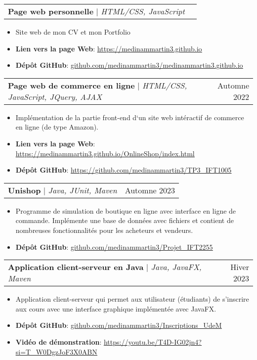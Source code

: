 \documentclass[letterpaper,11pt]{article}
\makeatletter
\newcommand{\resumeItem}[1]{
  \item\small{
    {#1 \vspace{-2pt}}
  }
}
\newcommand{\resumeProjectHeading}[2]{
    \item
    \begin{tabular*}{0.97\textwidth}{l@{\extracolsep{\fill}}r}
      \small#1 & #2 \\
    \end{tabular*}\vspace{-7pt}
}
\newcommand{\resumeItemListStart}{\begin{itemize}}
\newcommand{\resumeItemListEnd}{\end{itemize}\vspace{-5pt}}
\makeatother
\begin{document}
          \resumeProjectHeading
          {\textbf{Page web personnelle} $|$ \emph{HTML/CSS, JavaScript}}{}
          \resumeItemListStart
            \resumeItem{Site web de mon CV et mon Portfolio}
            \resumeItem{\textbf{Lien vers la page Web}: \href{https://medinammartin3.github.io}{\underline{https://medinammartin3.github.io}}}
            \resumeItem{\textbf{Dépôt GitHub}: \href{https://github.com/medinammartin3/medinammartin3.github.io}{\underline{github.com/medinammartin3/medinammartin3.github.io}}}
          \resumeItemListEnd

          \resumeProjectHeading
          {\textbf{Page web de commerce en ligne} $|$ \emph{HTML/CSS, JavaScript, JQuery, AJAX}}{Automne 2022}
          \resumeItemListStart
            \resumeItem{Implémentation de la partie front-end d‘un site web intéractif de commerce en ligne (de type Amazon).}
            \resumeItem{\textbf{Lien vers la page Web}: \href{https://medinammartin3.github.io/OnlineShop/index.html}{\underline{https://medinammartin3.github.io/OnlineShop/index.html}}}
            \resumeItem{\textbf{Dépôt GitHub}: \href{https://github.com/medinammartin3/TP3_IFT1005}{\underline{https://github.com/medinammartin3/TP3\_IFT1005}}}
          \resumeItemListEnd

          \resumeProjectHeading
          {\textbf{Unishop} $|$ \emph{Java, JUnit, Maven}}{Automne 2023}
          \resumeItemListStart
            \resumeItem{Programme de simulation de boutique en ligne avec interface en ligne de commande. Implémente une base de données avec fichiers et contient de nombreuses fonctionnalités pour les acheteurs et vendeurs.}
            \resumeItem{\textbf{Dépôt GitHub}: \href{https://github.com/medinammartin3/Projet_IFT2255}{\underline{github.com/medinammartin3/Projet\_IFT2255}}}
          \resumeItemListEnd

          \resumeProjectHeading
          {\textbf{Application client-serveur en Java} $|$ \emph{Java, JavaFX, Maven}}{Hiver 2023}
          \resumeItemListStart
            \resumeItem{Application client-serveur qui permet aux utilisateur (étudiants) de s’inscrire aux cours avec une interface graphique implémentée avec JavaFX.}
            \resumeItem{\textbf{Dépôt GitHub}: \href{https://github.com/medinammartin3/Inscriptions_UdeM}{\underline{github.com/medinammartin3/Inscriptions\_UdeM}}}
            \resumeItem{\textbf{Vidéo de démonstration}: \href{https://youtu.be/T4D-IG02jn4?si=T_W0DgzJoF3X0ABN}{\underline{https://youtu.be/T4D-IG02jn4?si=T\_W0DgzJoF3X0ABN}}}
          \resumeItemListEnd
      
\end{document}
